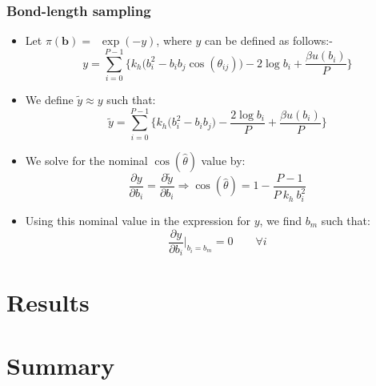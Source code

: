 \documentclass[xcolor=svgnames]{beamer}
\begin{document}
        \begin{frame}
            \frametitle{Bond-length sampling}
            \begin{itemize}
                \item Let $\pi(\mathbf{b}) = $~$ \exp (-y)$, where $y$ can be defined as follows:-
                \begin{equation*}
                \label{eq:y}
                    y = \displaystyle\sum\limits_{i=0}^{P-1} \Bigg\{ k_h  \Big( b_i^2 - b_i  b_j  \cos (\theta_{ij}) \Big) - 2  \log b_i + \frac{ \beta  u (b_i)}{P} \Bigg\}
                \end{equation*}
                \item We define $\tilde y \approx y$ such that: 
                \begin{equation*}
                \label{eq:ytilde}
                    \tilde y = \displaystyle\sum\limits_{i=0}^{P-1} \Bigg\{ k_h  \Big( b_i^2 - b_i  b_j \Big) - \frac{2  \log b_i}{P} + \frac{ \beta  u (b_i)}{P} \Bigg\}
                \end{equation*}
                \item We solve for the nominal $\cos (\hat \theta)$ value by:
                \begin{equation*}
                \label{eq:thetaHat}
                    \frac{\partial y}{\partial b_i} = \frac{\partial \tilde y}{\partial b_i} \Rightarrow \cos (\hat \theta) = 1 - \frac{P-1}{P~k_h~b_i^2}
                \end{equation*}
                \item Using this nominal value in the expression for $y$, we find $b_m$ such that:
                \begin{equation*}
                \label{eq:bm}
                    \displaystyle\frac{\partial y}{\partial b_i} \bigg|_{b_i = b_m} = 0 \qquad \forall i
                \end{equation*}
            \end{itemize}
        \end{frame}
	\section{Results}
	\section{Summary}
\end{document}
